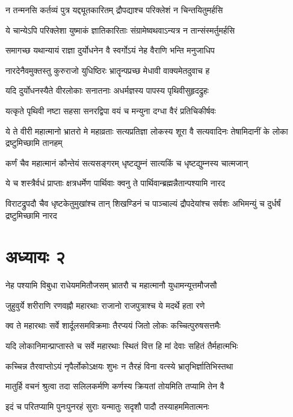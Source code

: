 \twolineshloka
{न तन्मनसि कर्तव्यं पुत्र यद्द्यूतकारितम्}
{द्रौपद्याश्च परिक्लेशं न चिन्तयितुमर्हसि}


\twolineshloka
{ये चान्येऽपि परिक्लेशा युष्माकं ज्ञातिकारिताः}
{संग्रामेष्वथवाऽन्यत्र न तान्संस्मर्तुमर्हसि}


\twolineshloka
{समागच्छ यथान्यायं राज्ञा दुर्योधनेन वै}
{स्वर्गोऽयं नेह वैराणि भन्ति मनुजाधिप}


\twolineshloka
{नारदेनैवमुक्तस्तु कुरुराजो युधिष्ठिरः}
{भ्रातॄन्पप्रच्छ मेधावी वाक्यमेतदुवाच ह}


\twolineshloka
{यदि दुर्योधनस्यैते वीरलोकाः सनातनाः}
{अधर्मज्ञस्य पापस्य पृथिवीसुहृदद्रुहः}


\twolineshloka
{यत्कृते पृथिवी नष्टा सहसा सनरद्विपा}
{वयं च मन्युना दग्धा वैरं प्रतिचिकीर्षवः}


\threelineshloka
{ये ते वीरी महात्मानो भ्रातरो मे महाव्रताः}
{सत्यप्रतिज्ञा लोकस्य शूरा वै सत्यवादिनः}
{तेषामिदानीं के लोका द्रष्टुमिच्छामि तानहम्}


\twolineshloka
{कर्णं चैव महात्मानं कौन्तेयं सत्यसङ्गरम्}
{धृष्टद्युम्नं सात्यकिं च धृष्टद्युम्नस्य चात्मजान्}


\twolineshloka
{ये च शस्त्रैर्वधं प्राप्ताः क्षत्रधर्मेण पार्थिवाः}
{क्वनु ते पार्थिवान्ब्रह्मन्नैतान्पश्यामि नारद}


\threelineshloka
{विराटद्रुपदौ चैव धृष्टकेतुमुखांश्च तान्}
{शिखण्डिनं च पाञ्चाल्यं द्रौपदेयांश्च सर्वशः}
{अभिमन्युं च दुर्धर्षं द्रष्टुमिच्छामि नारद}


\chapter{अध्यायः २}
\twolineshloka
{नेह पश्यामि विबुधा राधेयममितौजसम्}
{भ्रातरौ च महात्मानौ युधामन्यूत्तमौजसौ}


\twolineshloka
{जुहुवुर्ये शरीराणि रणवह्नौ महारथाः}
{राजानो राजपुत्राश्च ये मदर्थे हता रणे}


\twolineshloka
{क्व ते महारथाः सर्वे शार्दूलसमविक्रमाः}
{तैरप्ययं जितो लोकः कच्चित्पुरुषसत्तमैः}


\twolineshloka
{यदि लोकानिमान्प्राप्तास्ते च सर्वे महारथाः}
{स्थितं वित्त हि मां देवाः सहितं तैर्महात्मभिः}


\twolineshloka
{कच्चिन्न तैरवाप्तोऽयं नृपैर्लोकोऽक्षयः शुभः}
{न तैरहं विना वत्स्ये भ्रातृभिर्ज्ञातिभिस्तथा}


\twolineshloka
{मातुर्हि वचनं श्रुत्वा तदा सलिलकर्मणि}
{कर्णस्य क्रियतां तोयमिति तप्यामि तेन वै}


\twolineshloka
{इदं च परितप्यामि पुनःपुनरहं सुराः}
{यन्मातुः सदृशौ पादौ तस्याहममितात्मनः}


